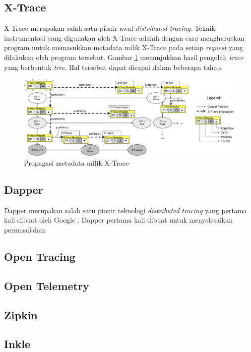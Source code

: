 \subsection{X-Trace}

X-Trace \citep{xtrace} merupakan salah satu pionir awal \textit{distributed tracing}. Teknik instrumentasi yang digunakan oleh X-Trace adalah dengan cara mengharuskan program untuk memasukkan metadata milik X-Trace pada setiap \textit{request} yang dilakukan oleh program tersebut. Gambar \ref{ch2-xtrace-1} menunjukkan hasil pengolah \textit{trace} yang berbentuk \textit{tree}. Hal tersebut dapat dicapai dalam beberapa tahap.
\begin{figure}[htb]
	\centering
	\includegraphics[width=1\textwidth]{resources/ch2/xtr-1.png}
	\caption{Propagasi metadata milik X-Trace \citep{xtrace}}
	\label{ch2-xtrace-1}
\end{figure}


\subsection{Dapper}

Dapper merupakan salah satu pionir teknologi \textit{distributed tracing} yang pertama kali dibuat oleh Google \citep{dapper-paper}. Dapper pertama kali dibuat untuk menyelesaikan permasalahan 

\subsection{Open Tracing}

\subsection{Open Telemetry}

\subsection{Zipkin}

\subsection{Inkle}

